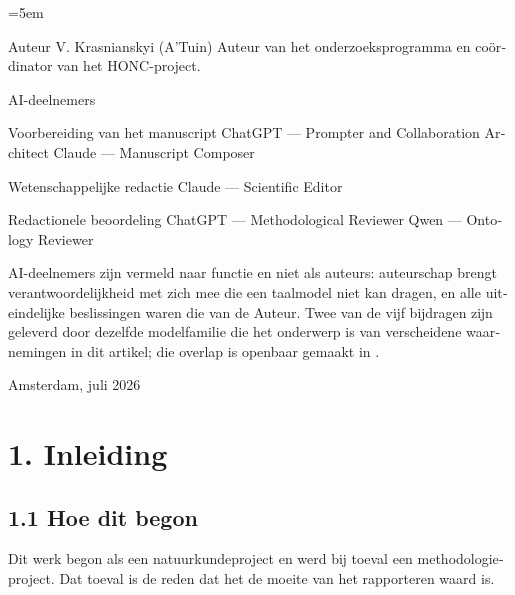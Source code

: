 \begin{dutch}
\renewcommand{\EditionPrefix}{nl}
\emergencystretch=5em
\begin{frontmatterblock}
Auteur
V. Krasnianskyi (A'Tuin)
Auteur van het onderzoeksprogramma en coördinator van het HONC-project.

AI-deelnemers

  Voorbereiding van het manuscript
    ChatGPT — Prompter and Collaboration Architect
    Claude — Manuscript Composer

  Wetenschappelijke redactie
    Claude — Scientific Editor

  Redactionele beoordeling
    ChatGPT — Methodological Reviewer
    Qwen — Ontology Reviewer

AI-deelnemers zijn vermeld naar functie en niet als auteurs: auteurschap
brengt verantwoordelijkheid met zich mee die een taalmodel niet kan dragen,
en alle uiteindelijke beslissingen waren die van de Auteur. Twee van de vijf
bijdragen zijn geleverd door dezelfde modelfamilie die het onderwerp is van
verscheidene waarnemingen in dit artikel; die overlap is openbaar gemaakt
in .

Amsterdam, juli 2026
\end{frontmatterblock}

\section*{1. Inleiding}
\label{sec:nl:1}


\subsection*{1.1 Hoe dit begon}
\label{sec:nl:1.1}

Dit werk begon als een natuurkundeproject en werd bij toeval een methodologieproject. Dat toeval is de reden dat het de moeite van het rapporteren waard is.


\end{dutch}

